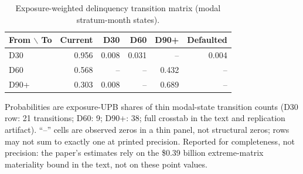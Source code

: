 \documentclass[12pt]{article}
\begin{document}
\begin{table}[H]
\centering
\small
\begin{threeparttable}
\caption{Exposure-weighted delinquency transition matrix (modal stratum-month states).}
\label{tab:delinq}
\begin{tabular}{@{}lrrrrr@{}}
\toprule
From $\backslash$ To & Current & D30 & D60 & D90+ & Defaulted \\
\midrule
D30 & 0.956 & 0.008 & 0.031 & -- & 0.004 \\
D60 & 0.568 & -- & -- & 0.432 & -- \\
D90+ & 0.303 & 0.008 & -- & 0.689 & -- \\
\bottomrule
\end{tabular}
\begin{tablenotes}[flushleft]\footnotesize
\item Probabilities are exposure-UPB shares of thin modal-state transition counts (D30 row: 21 transitions; D60: 9; D90+: 38; full crosstab in the text and replication artifact). ``--'' cells are observed zeros in a thin panel, not structural zeros; rows may not sum to exactly one at printed precision. Reported for completeness, not precision: the paper's estimates rely on the \$0.39 billion extreme-matrix materiality bound in the text, not on these point values.
\end{tablenotes}
\end{threeparttable}
\end{table}
\end{document}
